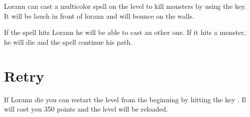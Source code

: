 \documentclass{report}
\begin{document}
Lorann can cast a multicolor spell on the level to kill monsters by using the  key. It will be lauch in front of lorann and will bounce on the walls.

If the spell hits Lorann he will be able to cast an other one. If it hits a monster, he will die and the spell continue his path.

\section{Retry}

If Lorann die you can restart the level from the beginning by hitting the key . Il will cost you 350 points and the level will be reloaded.
\end{document}
